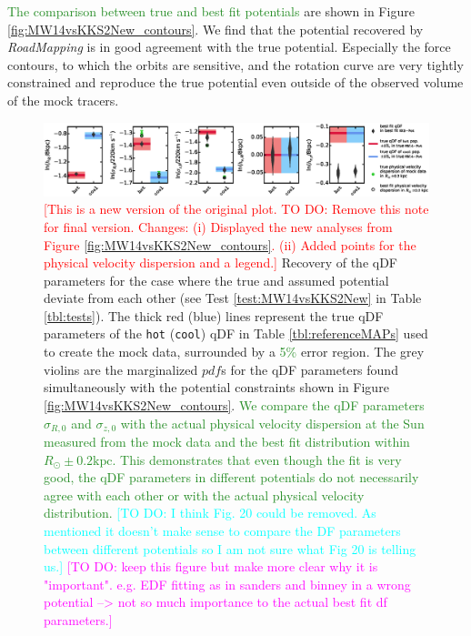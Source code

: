 \documentclass[iop,revtex4]{emulateapj}
\newcommand{\pdf}{\ensuremath{pdf}}
\newcommand{\RM}{{\sl RoadMapping}}
\newcommand{\HW}[1]{\textcolor{Cyan}{#1}}
\newcommand{\NEW}[1]{\textcolor{ForestGreen}{#1}}
\newcommand{\Wilma}[1]{\textcolor{Magenta}{#1}}
\newcommand{\NOTE}[1]{\textcolor{Red}{#1}}
\newcommand{\OLD}[1]{}
\begin{document}
\OLD{The results for the potential}\NEW{The comparison between true and best fit potentials} are shown in Figure \ref{fig:MW14vsKKS2New_contours}. We find that the potential recovered by \RM{} is in good agreement with the true potential. Especially the force contours, to which the orbits are sensitive, and the rotation curve are very tightly constrained and reproduce the true potential even outside of the observed volume of the mock tracers.

\begin{figure}[!htb]
\includegraphics[width=1\textwidth]{figs/MW14vsKKS2New_violins.eps}
\caption{\NOTE{[This is a new version of the original plot. TO DO: Remove this note for final version. Changes: (i) Displayed the new analyses from Figure \ref{fig:MW14vsKKS2New_contours}. (ii) Added points for the physical velocity dispersion and a legend.]} Recovery of the qDF parameters for the case where the true and assumed potential deviate from each other (see Test \ref{test:MW14vsKKS2New} in Table \ref{tbl:tests}). The thick red (blue) lines represent the true qDF parameters of the \texttt{hot} (\texttt{cool}) qDF in Table \ref{tbl:referenceMAPs} used to create the mock data, surrounded by a \OLD{10\%}\NEW{5\%} error region. The grey violins are the marginalized \pdf{}s for the qDF parameters found simultaneously with the potential constraints shown in Figure \ref{fig:MW14vsKKS2New_contours}. \NEW{We compare the qDF parameters $\sigma_{R,0}$ and $\sigma_{z,0}$ with the actual physical velocity dispersion at the Sun measured from the mock data and the best fit distribution within $R_\odot\pm0.2\text{kpc}$. This demonstrates that even though the fit is very good, the qDF parameters in different potentials do not necessarily agree with each other or with the actual physical velocity distribution.} \HW{[TO DO: I think Fig. 20 could be removed. As mentioned it doesn't make sense to compare the DF parameters between different potentials so I am not sure what Fig 20 is telling us.]} \Wilma{[TO DO: keep this figure but make more clear why it is "important". e.g. EDF fitting as in sanders and binney in a wrong potential --> not so much importance to the actual best fit df parameters.]}}
\label{fig:MW14vsKKS2New_violins}
\end{figure}
\end{document}
